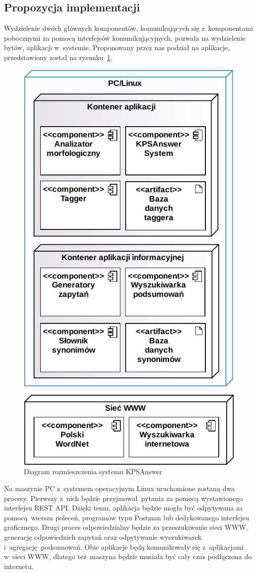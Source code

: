 \subsection{Propozycja implementacji}
Wydzielenie dwóch głównych komponentów, komunikujących się z~komponentami pobocznymi za pomocą interfejsów komunikującyjnych, pozwala na wydzielenie bytów, aplikacji w~systemie. Proponowany przez nas podział na aplikacje, przedstawiony został na rysunku~\ref{fig:system-deployment}.

\begin{figure}[h!]
    \centering
    \includegraphics[width=0.8\columnwidth]{figures/WEDT-Deployment.pdf}
    \caption{Diagram rozmieszczenia systemu KPSAnswer}
    \label{fig:system-deployment}
\end{figure}

Na maszynie PC z~systemem operacyjnym Linux uruchomione zostaną dwa procesy. Pierwszy z~nich będzie przyjmował pytania za pomocą wystawionego interfejsu REST API. Dzięki temu, aplikacja będzie mogła być odpytywana za pomocą wiersza poleceń, programów typu Postman lub dedykowanego interfejsu graficznego. Drugi proces odpowiedzialny będzie za przeszukiwanie sieci WWW, generację odpowiednich zapytań oraz odpytywanie wyszukiwarek i~agregację podsumowań. Obie aplikacje będą komunikowały się z~aplikacjami w~sieci WWW, dlatego też maszyna będzie musiała być cały czas podłączona do internetu.  